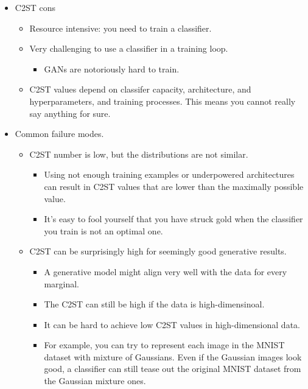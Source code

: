 \documentclass[10pt]{article}
\begin{document}
\begin{itemize}
    \item C2ST cons
    \begin{itemize}
        \item Resource intensive: you need to train a classifier.
        \item Very challenging to use a classifier in a training loop.
        \begin{itemize}
            \item GANs are notoriously hard to train.
        \end{itemize}
        \item C2ST values depend on classifer capacity, architecture, and hyperparameters, and training processes. This means you cannot really say anything for sure.
    \end{itemize}

    \item Common failure modes.
    \begin{itemize}
        \item C2ST number is low, but the distributions are not similar.
        \begin{itemize}
            \item Using not enough training examples or underpowered architectures can result in C2ST values that are lower than the maximally possible value.            
            \item It's easy to fool yourself that you have struck gold when the classifier you train is not an optimal one.
        \end{itemize}
        
        \item C2ST can be surprisingly high for seemingly good generative results.
        \begin{itemize}
            \item A generative model might align very well with the data for every marginal.
            \item The C2ST can still be high if the data is high-dimensinoal.
            \item It can be hard to achieve low C2ST values in high-dimensional data.
            \item For example, you can try to represent each image in the MNIST dataset with mixture of Gaussians. Even if the Gaussian images look good, a classifier can still tease out the original MNIST dataset from the Gaussian mixture ones.
        \end{itemize}
    \end{itemize}


\end{itemize}
\end{document}
